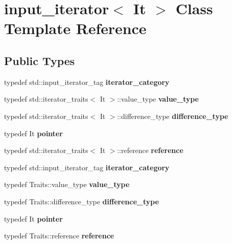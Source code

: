 \hypertarget{classinput__iterator}{}\section{input\+\_\+iterator$<$ It $>$ Class Template Reference}
\label{classinput__iterator}
\subsection*{Public Types}
\begin{DoxyCompactItemize}
\item 
\mbox{\label{classinput__iterator_a764599aea7e7b07ca611a95f6c7097a3}} 
typedef std\+::input\+\_\+iterator\+\_\+tag {\bfseries iterator\+\_\+category}
\item 
\mbox{\label{classinput__iterator_aae5623774c545b41226ebfae770812b6}} 
typedef std\+::iterator\+\_\+traits$<$ It $>$\+::value\+\_\+type {\bfseries value\+\_\+type}
\item 
\mbox{\label{classinput__iterator_a4b1074039d9def5cf533c6dfff7d15d2}} 
typedef std\+::iterator\+\_\+traits$<$ It $>$\+::difference\+\_\+type {\bfseries difference\+\_\+type}
\item 
\mbox{\label{classinput__iterator_af96ccc380a47ef5b75bf4811fa538d8d}} 
typedef It {\bfseries pointer}
\item 
\mbox{\label{classinput__iterator_aee04f771d9f3aaa2a4a32a933210ef47}} 
typedef std\+::iterator\+\_\+traits$<$ It $>$\+::reference {\bfseries reference}
\item 
\mbox{\label{classinput__iterator_a764599aea7e7b07ca611a95f6c7097a3}} 
typedef std\+::input\+\_\+iterator\+\_\+tag {\bfseries iterator\+\_\+category}
\item 
\mbox{\label{classinput__iterator_a4d394f4822420dc2795905b80ca556e2}} 
typedef Traits\+::value\+\_\+type {\bfseries value\+\_\+type}
\item 
\mbox{\label{classinput__iterator_ae4f8f9c53fba0f86faf0908d414fa1a1}} 
typedef Traits\+::difference\+\_\+type {\bfseries difference\+\_\+type}
\item 
\mbox{\label{classinput__iterator_af96ccc380a47ef5b75bf4811fa538d8d}} 
typedef It {\bfseries pointer}
\item 
\mbox{\label{classinput__iterator_aeb697de280cfe13ea8b6ab47eee9f4c3}} 
typedef Traits\+::reference {\bfseries reference}
\end{DoxyCompactItemize}

